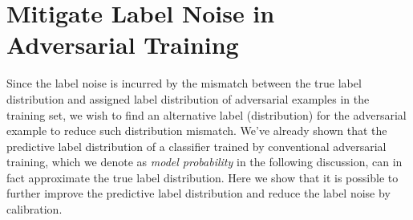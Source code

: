 \section{Mitigate Label Noise in Adversarial Training}
\label{sect:mitigate-double-descent}

Since the label noise is incurred by the mismatch between the true label distribution and assigned label distribution of adversarial examples in the training set, we wish to find an alternative label (distribution) for the adversarial example to reduce such distribution mismatch.
We've already shown that the predictive label distribution of a classifier trained by conventional adversarial training, which we denote as \emph{model probability} in the following discussion, can in fact approximate the true label distribution. 
Here we show that it is possible to further improve the predictive label distribution and reduce the label noise by calibration.
    

